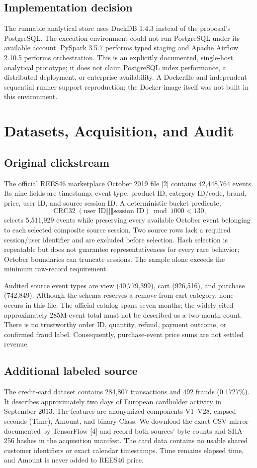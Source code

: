 \documentclass[conference]{IEEEtran}
\begin{document}
\subsection{Implementation decision}
The runnable analytical store uses DuckDB 1.4.3 instead of the proposal's PostgreSQL. The execution environment could not run PostgreSQL under its available account. PySpark 3.5.7 performs typed staging and Apache Airflow 2.10.5 performs orchestration. This is an explicitly documented, single-host analytical prototype; it does not claim PostgreSQL index performance, a distributed deployment, or enterprise availability. A Dockerfile and independent sequential runner support reproduction; the Docker image itself was not built in this environment.

\section{Datasets, Acquisition, and Audit}
\subsection{Original clickstream}
The official REES46 marketplace October 2019 file [2] contains 42,448,764 events. Its nine fields are timestamp, event type, product ID, category ID/code, brand, price, user ID, and source session ID. A deterministic bucket predicate,
\begin{equation}
\operatorname{CRC32}(\text{user ID}\Vert\texttt{|}\Vert\text{session ID})\bmod1000<130,
\end{equation}
selects 5,511,929 events while preserving every available October event belonging to each selected composite source session. Two source rows lack a required session/user identifier and are excluded before selection. Hash selection is repeatable but does not guarantee representativeness for every rare behavior; October boundaries can truncate sessions. The sample alone exceeds the minimum raw-record requirement.

Audited source event types are view (40,779,399), cart (926,516), and purchase (742,849). Although the schema reserves a remove-from-cart category, none occurs in this file. The official catalog spans seven months; the widely cited approximately 285M-event total must not be described as a two-month count. There is no trustworthy order ID, quantity, refund, payment outcome, or confirmed fraud label. Consequently, purchase-event price sums are not settled revenue.

\subsection{Additional labeled source}
The credit-card dataset contains 284,807 transactions and 492 frauds (0.1727\%). It describes approximately two days of European cardholder activity in September 2013. The features are anonymized components V1--V28, elapsed seconds (Time), Amount, and binary Class. We download the exact CSV mirror documented by TensorFlow [4] and record both sources' byte counts and SHA-256 hashes in the acquisition manifest. The card data contains no usable shared customer identifiers or exact calendar timestamps. Time remains elapsed time, and Amount is never added to REES46 price.
\end{document}
